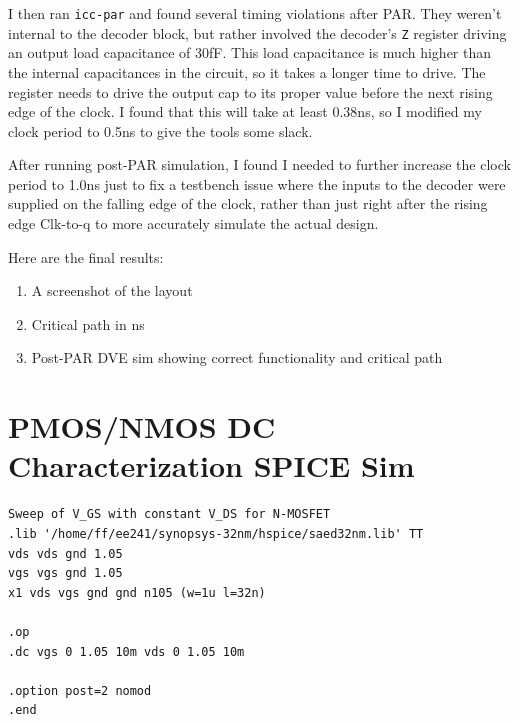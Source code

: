 \documentclass[11pt]{article}
\begin{document}
I then ran \verb|icc-par| and found several timing violations after PAR. They weren't internal to the decoder block, but rather involved the decoder's \verb|Z| register driving an output load capacitance of 30fF. This load capacitance is much higher than the internal capacitances in the circuit, so it takes a longer time to drive. The register needs to drive the output cap to its proper value before the next rising edge of the clock. I found that this will take at least 0.38ns, so I modified my clock period to 0.5ns to give the tools some slack.

After running post-PAR simulation, I found I needed to further increase the clock period to 1.0ns just to fix a testbench issue where the inputs to the decoder were supplied on the falling edge of the clock, rather than just right after the rising edge Clk-to-q to more accurately simulate the actual design.

Here are the final results:

\begin{enumerate}
	\item A screenshot of the layout
	\item Critical path in ns
	\item Post-PAR DVE sim showing correct functionality and critical path
\end{enumerate}
\newpage
\appendix
\section{PMOS/NMOS DC Characterization SPICE Sim} \label{dc_characterization_spice}
\begin{verbatim}
Sweep of V_GS with constant V_DS for N-MOSFET
.lib '/home/ff/ee241/synopsys-32nm/hspice/saed32nm.lib' TT
vds vds gnd 1.05
vgs vgs gnd 1.05 
x1 vds vgs gnd gnd n105 (w=1u l=32n)

.op
.dc vgs 0 1.05 10m vds 0 1.05 10m

.option post=2 nomod
.end
\end{verbatim}

\section{}
\end{document}
